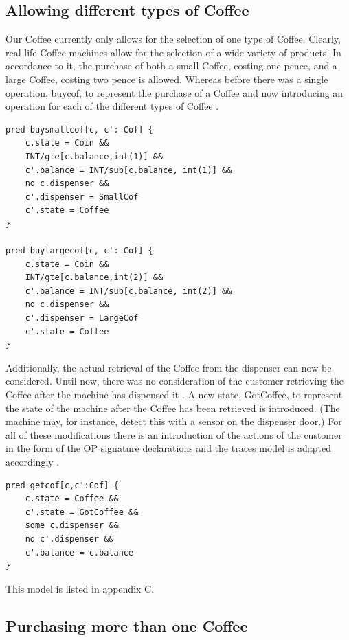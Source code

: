 \documentclass[a4paper,10pt]{report}
\begin{document}
\subsection{Allowing different types of Coffee}
\label{Different Coffees}

Our Coffee currently only allows for the selection of one type of Coffee. Clearly, real life Coffee machines allow for the selection of a wide variety of products. In accordance to it, the purchase of both a small Coffee, costing one pence, and a large Coffee, costing two pence is allowed. Whereas before there was a single operation, buycof, to represent the purchase of a Coffee and now introducing an operation for each of the different types of Coffee \cite{Boyatt}.

\begin{verbatim}
pred buysmallcof[c, c': Cof] {
	c.state = Coin &&
	INT/gte[c.balance,int(1)] &&
	c'.balance = INT/sub[c.balance, int(1)] &&
	no c.dispenser &&
	c'.dispenser = SmallCof
	c'.state = Coffee
}

pred buylargecof[c, c': Cof] {
	c.state = Coin &&
	INT/gte[c.balance,int(2)] &&
	c'.balance = INT/sub[c.balance, int(2)] &&
	no c.dispenser &&
	c'.dispenser = LargeCof
	c'.state = Coffee
}
\end{verbatim}

 Additionally, the actual retrieval of the Coffee from the dispenser can now be considered. Until now, there was no consideration of the customer retrieving the Coffee after the machine has dispensed it \cite{Boyatt}. A new state, GotCoffee, to represent the state of the machine after the Coffee has been retrieved is introduced. (The machine may, for instance, detect this with a sensor on the dispenser door.) For all of these modifications there is an introduction of the actions of the customer in the form of the OP signature declarations and the traces model is adapted accordingly \cite{Boyatt}.
 
\begin{verbatim}
pred getcof[c,c':Cof] {
	c.state = Coffee &&
	c'.state = GotCoffee &&
	some c.dispenser &&
	no c'.dispenser &&
	c'.balance = c.balance
}
\end{verbatim}

 This model is listed in appendix C.
 
\subsection{Purchasing more than one Coffee}
\label{Purchasing more than one coffee}
\end{document}
